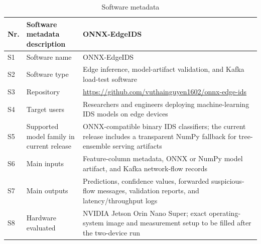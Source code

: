 \begin{table}[t]
\caption*{Software metadata}
\small
\renewcommand{\arraystretch}{1.18}
\begin{tabularx}{\textwidth}{@{}l >{\raggedright\arraybackslash}p{} >{\raggedright\arraybackslash}X@{}}
\toprule
Nr. & Software metadata description & ONNX-EdgeIDS \\
\midrule
S1 & Software name & ONNX-EdgeIDS \\
S2 & Software type & Edge inference, model-artifact validation, and Kafka load-test software \\
S3 & Repository & \url{https://github.com/vuthainguyen1602/onnx-edge-ids} \\
S4 & Target users & Researchers and engineers deploying machine-learning IDS models on edge devices \\
S5 & Supported model family in current release & ONNX-compatible binary IDS classifiers; the current release includes a transparent NumPy fallback for tree-ensemble serving artifacts \\
S6 & Main inputs & Feature-column metadata, ONNX or NumPy model artifact, and Kafka network-flow records \\
S7 & Main outputs & Predictions, confidence values, forwarded suspicious-flow messages, validation reports, and latency/throughput logs \\
S8 & Hardware evaluated & NVIDIA Jetson Orin Nano Super; exact operating-system image and measurement setup to be filled after the two-device run \\
\bottomrule
\end{tabularx}
\end{table}
